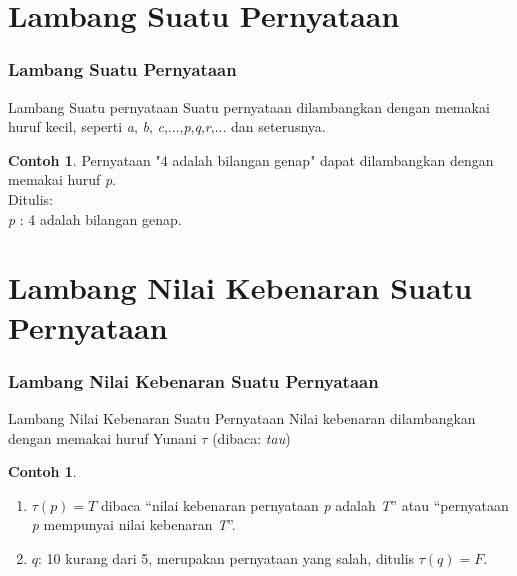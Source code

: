 \documentclass[handout]{beamer}
\theoremstyle{definition}
\theoremstyle{example}
\newtheorem{contoh}[theorem]{Contoh}
\begin{document}
\section{Lambang Suatu Pernyataan}
\begin{frame}
\frametitle{Lambang Suatu Pernyataan}

\begin{block}{Lambang Suatu pernyataan}
 Suatu pernyataan dilambangkan dengan memakai huruf kecil, seperti \textit{a}, \textit{b}, \textit{c},...,\textit{p},\textit{q},\textit{r},... dan seterusnya.
\end{block}

\begin{contoh}
	Pernyataan "4 adalah bilangan genap" dapat dilambangkan dengan memakai huruf \textit{p}.\\
	Ditulis:\\
	\textit{p} :  4 adalah bilangan genap.
\end{contoh}
\end{frame}

\section{Lambang Nilai Kebenaran Suatu Pernyataan}
\begin{frame}
\frametitle{Lambang Nilai Kebenaran Suatu Pernyataan}
\begin{block}{Lambang Nilai Kebenaran Suatu Pernyataan}
Nilai kebenaran dilambangkan dengan memakai huruf Yunani $\tau$ (dibaca: \textit{tau})
\end{block}
  \begin{contoh}
  	\begin{enumerate}
	 \item $\tau(\textit{p}) = T$ dibaca “nilai kebenaran pernyataan \textit{p} adalah \textit{T}” atau “pernyataan \textit{p} mempunyai nilai kebenaran \textit{T}”.
	\item $\textit{q}$: 10 kurang dari 5, merupakan pernyataan yang salah, ditulis $\tau(\textit{q}) = F$.
    \end{enumerate}
  \end{contoh}
\end{frame}
\end{document}
